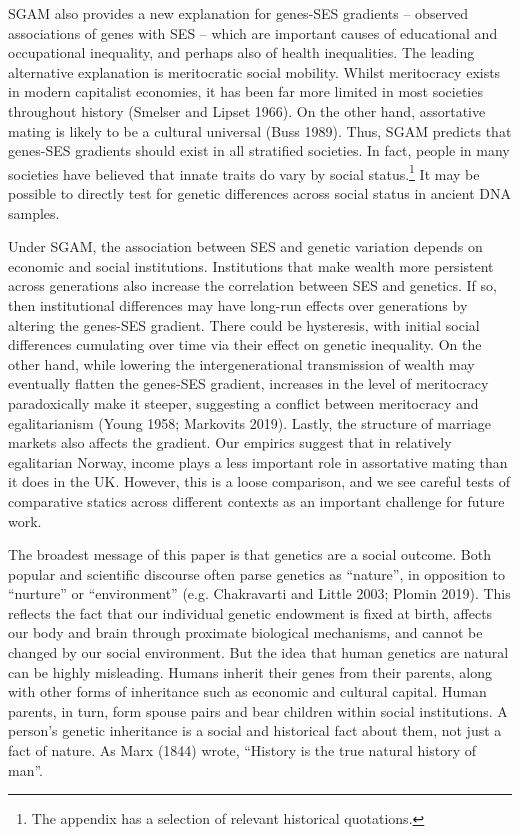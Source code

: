 \documentclass[
  12pt,
]{article}
\theoremstyle{definition}
\theoremstyle{definition}
\theoremstyle{definition}
\theoremstyle{definition}
\theoremstyle{remark}
\begin{document}
SGAM also provides a new explanation for genes-SES gradients -- observed
associations of genes with SES -- which are important causes of
educational and occupational inequality, and perhaps also of health
inequalities. The leading alternative explanation is meritocratic social
mobility. Whilst meritocracy exists in modern capitalist economies, it
has been far more limited in most societies throughout history
(Smelser and Lipset 1966). On the other hand, assortative mating is likely to
be a cultural universal (Buss 1989). Thus, SGAM predicts that
genes-SES gradients should exist in all stratified societies. In fact,
people in many societies have believed that innate traits do vary by
social status.\footnote{The appendix has a selection of relevant historical quotations.} It may be possible to directly test for genetic
differences across social status in ancient DNA samples.

Under SGAM, the association between SES and genetic variation depends on
economic and social institutions. Institutions that make wealth more
persistent across generations also increase the correlation between SES
and genetics. If so, then institutional differences may have long-run
effects over generations by altering the genes-SES gradient. There could
be hysteresis, with initial social differences cumulating over time via
their effect on genetic inequality. On the other hand, while lowering
the intergenerational transmission of wealth may eventually flatten the
genes-SES gradient, increases in the level of meritocracy paradoxically
make it steeper, suggesting a conflict between meritocracy and
egalitarianism (Young 1958; Markovits 2019). Lastly, the
structure of marriage markets also affects the gradient. Our empirics
suggest that in relatively egalitarian Norway, income plays a less
important role in assortative mating than it does in the UK. However,
this is a loose comparison, and we see careful tests of comparative
statics across different contexts as an important challenge for future
work.

The broadest message of this paper is that genetics are a social
outcome. Both popular and scientific discourse often parse genetics as
``nature'', in opposition to ``nurture'' or ``environment'' (e.g. Chakravarti and Little 2003; Plomin 2019). This reflects the fact
that our individual genetic endowment is fixed at birth, affects our
body and brain through proximate biological mechanisms, and cannot be
changed by our social environment. But the idea that human genetics are
natural can be highly misleading. Humans inherit their genes from their
parents, along with other forms of inheritance such as economic and
cultural capital. Human parents, in turn, form spouse pairs and bear
children within social institutions. A person's genetic inheritance is a
social and historical fact about them, not just a fact of nature. As
Marx (1844) wrote, ``History is the true natural history of man''.
\end{document}
